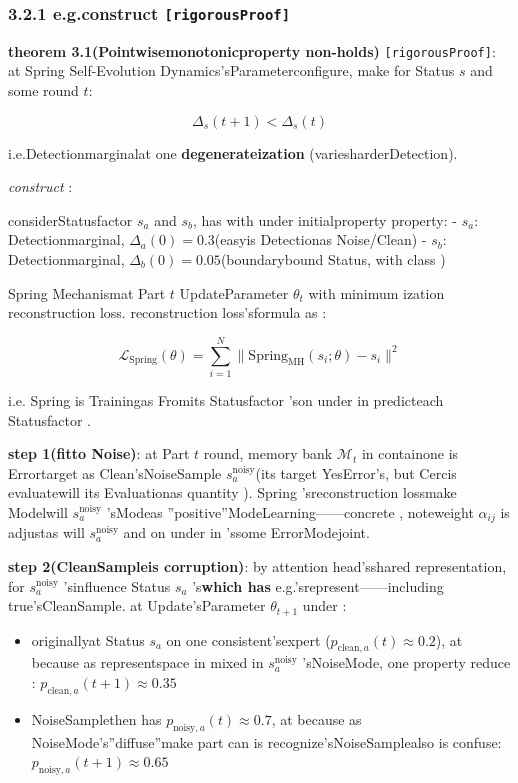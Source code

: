 \documentclass[
  12pt,
]{article}
\begin{document}
\subsubsection{\texorpdfstring{3.2.1 e.g.construct 
\texttt{{[}rigorousProof{]}}}{3.2.1 e.g.construct  {[}rigorousProof{]}}}\label{ux53cdux4f8bux6784ux9020-ux4e25ux683cux8bc1ux660e}

\textbf{theorem  3.1(Pointwisemonotonicproperty non-holds)} \texttt{{[}rigorousProof{]}}: at 
Spring Self-Evolution Dynamics'sParameterconfigure, make for Status \(s\) and some round \(t\): 

\[\Delta_s(t+1) < \Delta_s(t)\]

i.e.Detectionmarginalat one \textbf{degenerateization }(variesharderDetection). 

\emph{construct }: 

considerStatusfactor  \(s_a\) and  \(s_b\), has with under initialproperty property:  -
\(s_a\): Detectionmarginal, \(\Delta_a(0) = 0.3\)(easyis Detectionas Noise/Clean) -
\(s_b\): Detectionmarginal, \(\Delta_b(0) = 0.05\)(boundarybound Status, with class )

Spring Mechanismat Part \(t\) UpdateParameter \(\theta_t\)
with minimum ization reconstruction loss. reconstruction loss'sformula as : 

\[\mathcal{L}_{\text{Spring}}(\theta) = \sum_{i=1}^{N} \|\text{Spring}_{\text{MH}}(s_i; \theta) - s_i\|^2\]

i.e. Spring is Trainingas Fromits Statusfactor 'son under in predicteach Statusfactor . 

\textbf{step 1(fitto Noise)}: at Part \(t\) round, memory bank \(\mathcal{M}_t\)
in containone is Errortarget as Clean'sNoiseSample
\(s_a^{\text{noisy}}\)(its target YesError's, but  Cercis
evaluatewill its Evaluationas quantity ). Spring 'sreconstruction lossmake Modelwill 
\(s_a^{\text{noisy}}\)
'sModeas ''positive''ModeLearning------concrete , noteweight \(\alpha_{ij}\)
is adjustas will  \(s_a^{\text{noisy}}\) and on under in 'ssome ErrorModejoint. 

\textbf{step 2(CleanSampleis corruption)}: by attention head'sshared representation, for 
\(s_a^{\text{noisy}}\) 'sinfluence Status \(s_a\)
's\textbf{which has }e.g.'srepresent------including true'sCleanSample. at Update'sParameter
\(\theta_{t+1}\) under : 

\begin{itemize}
\item
  originallyat Status \(s_a\)
  on one consistent'sexpert (\(p_{\text{clean},a}(t) \approx 0.2\)), at because as representspace in mixed in
  \(s_a^{\text{noisy}}\)
  'sNoiseMode, one property reduce : \(p_{\text{clean},a}(t+1) \approx 0.35\)
\item
  NoiseSamplethen has 
  \(p_{\text{noisy},a}(t) \approx 0.7\), at because as NoiseMode's''diffuse''make part can is recognize'sNoiseSamplealso is confuse: \(p_{\text{noisy},a}(t+1) \approx 0.65\)
\end{itemize}
\end{document}
